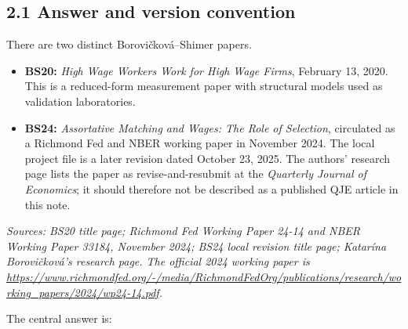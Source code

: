 \documentclass[11pt]{article}
\begin{document}
\subsection{2.1 Answer and version convention}

There are two distinct Borovi\v{c}kov\'a--Shimer papers.

\begin{itemize}
\item \textbf{BS20:} \emph{High Wage Workers Work for High Wage Firms},
  February 13, 2020.  This is a reduced-form measurement paper with structural
  models used as validation laboratories.
\item \textbf{BS24:} \emph{Assortative Matching and Wages: The Role of
  Selection}, circulated as a Richmond Fed and NBER working paper in November
  2024.  The local project file is a later revision dated October 23, 2025.
  The authors' research page lists the paper as revise-and-resubmit at the
  \emph{Quarterly Journal of Economics}; it should therefore not be described
  as a published QJE article in this note.
\end{itemize}

\textit{Sources: BS20 title page; Richmond Fed Working Paper 24-14 and NBER
Working Paper 33184, November 2024; BS24 local revision title page; Katar\'ina
Borovi\v{c}kov\'a's research page.  The official 2024 working paper is
\url{https://www.richmondfed.org/-/media/RichmondFedOrg/publications/research/working_papers/2024/wp24-14.pdf}.}

The central answer is:
\end{document}
